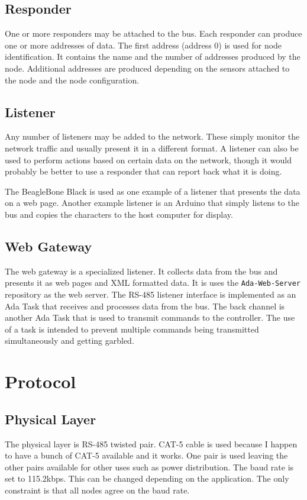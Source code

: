 \documentclass[10pt, openany, draft]{article}
\begin{document}
\subsection{Responder}
One or more responders may be attached to the bus.  Each responder can produce one or more addresses of data.  The first address (address 0) is used for node identification.  It contains the name and the number of addresses produced by the node.  Additional addresses are produced depending on the sensors attached to the node and the node configuration.

\subsection{Listener}
Any number of listeners may be added to the network.  These simply monitor the network traffic and usually present it in a different format.  A listener can also be used to perform actions based on certain data on the network, though it would probably be better to use a responder that can report back what it is doing.

The BeagleBone Black is used as one example of a listener that presents the data on a web page.  Another example listener is an Arduino that simply listens to the bus and copies the characters to the host computer for display.

\subsection{Web Gateway}
The web gateway is a specialized listener.  It collects data from the bus and presents it as web pages and XML formatted data.  It is uses the \texttt{Ada-Web-Server} repository as the web server.  The RS-485 listener interface is implemented as an Ada Task that receives and processes data from the bus.  The back channel is another Ada Task that is used to transmit commands to the controller.  The use of a task is intended to prevent multiple commands being transmitted simultaneously and getting garbled.

\section{Protocol}
\subsection{Physical Layer}
The physical layer is RS-485 twisted pair.  CAT-5 cable is used because I happen to have a bunch of CAT-5 available and it works.  One pair is used leaving the other pairs available for other uses such as power distribution.  The baud rate is set to 115.2kbps.  This can be changed depending on the application.  The only constraint is that all nodes agree on the baud rate.
\end{document}
